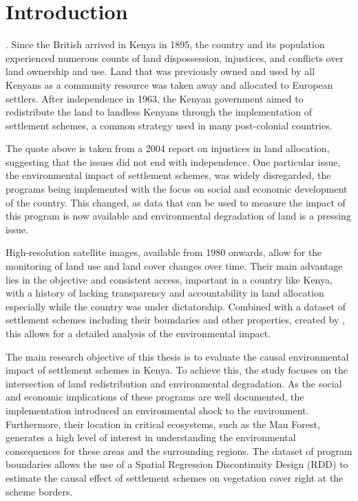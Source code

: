 \section{Introduction}
\label{sec:intro}

 \parencite{ndunguReportComissionInquiry2004}.
Since the British arrived in Kenya in 1895, the country and its population experienced numerous counts of land dispossession, injustices, and conflicts over land ownership and use.
Land that was previously owned and used by all Kenyans as a community resource was taken away and allocated to European settlers.
After independence in 1963, the Kenyan government aimed to redistribute the land to landless Kenyans through the implementation of settlement schemes, a common strategy used in many post-colonial countries.

The quote above is taken from a 2004 report on injustices in land allocation, suggesting that the issues did not end with independence.
One particular issue, the environmental impact of settlement schemes, was widely disregarded, the programs being implemented with the focus on social and economic development of the country.
This changed, as data that can be used to measure the impact of this program is now available and environmental degradation of land is a pressing issue.

High-resolution satellite images, available from 1980 onwards, allow for the monitoring of land use and land cover changes over time.
Their main advantage lies in the objective and consistent access, important in a country like Kenya,
with a history of lacking transparency and accountability in land allocation especially while the country was under dictatorship.
Combined with a dataset of settlement schemes including their boundaries and other properties, created by \cite{boonePromisedLandSettlement2021}, this allows for a detailed analysis of the environmental impact.

The main research objective of this thesis is to evaluate the causal environmental impact of settlement schemes in Kenya.
To achieve this, the study focuses on the intersection of land redistribution and environmental degradation.
As the social and economic implications of these programs are well documented, the implementation introduced an environmental shock to the environment.
Furthermore, their location in critical ecosystems, such as the Mau Forest, generates a high level of interest in understanding the environmental consequences for these areas and the surrounding regions.
The dataset of program boundaries allows the use of a Spatial Regression Discontinuity Design (RDD) to estimate the causal effect of settlement schemes on vegetation cover right at the scheme borders.

